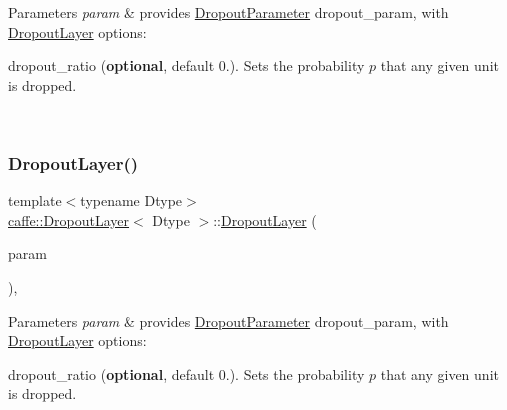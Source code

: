 \begin{DoxyParams}{Parameters}
{\em param} & provides \mbox{\hyperlink{classcaffe_1_1_dropout_parameter}{Dropout\+Parameter}} dropout\+\_\+param, with \mbox{\hyperlink{classcaffe_1_1_dropout_layer}{Dropout\+Layer}} options\+:
\begin{DoxyItemize}
\item dropout\+\_\+ratio ({\bfseries optional}, default 0.). Sets the probability $ p $ that any given unit is dropped. 
\end{DoxyItemize}\\
\hline
\end{DoxyParams}
\mbox{\label{classcaffe_1_1_dropout_layer_a24cbddd4699b102a9555d3b8013c16d0}} 
\subsubsection{\texorpdfstring{Dropout\+Layer()}{DropoutLayer()}\hspace{0.1cm}{\footnotesize\ttfamily [2/2]}}
{\footnotesize\ttfamily template$<$typename Dtype$>$ \\
\mbox{\hyperlink{classcaffe_1_1_dropout_layer}{caffe\+::\+Dropout\+Layer}}$<$ Dtype $>$\+::\mbox{\hyperlink{classcaffe_1_1_dropout_layer}{Dropout\+Layer}} (\begin{DoxyParamCaption}\item[{const \mbox{\hyperlink{classcaffe_1_1_layer_parameter}{Layer\+Parameter}} \&}]{param }\end{DoxyParamCaption})\hspace{0.3cm}{\ttfamily [inline]}, {\ttfamily [explicit]}}


\begin{DoxyParams}{Parameters}
{\em param} & provides \mbox{\hyperlink{classcaffe_1_1_dropout_parameter}{Dropout\+Parameter}} dropout\+\_\+param, with \mbox{\hyperlink{classcaffe_1_1_dropout_layer}{Dropout\+Layer}} options\+:
\begin{DoxyItemize}
\item dropout\+\_\+ratio ({\bfseries optional}, default 0.). Sets the probability $ p $ that any given unit is dropped. 
\end{DoxyItemize}\\
\hline
\end{DoxyParams}



